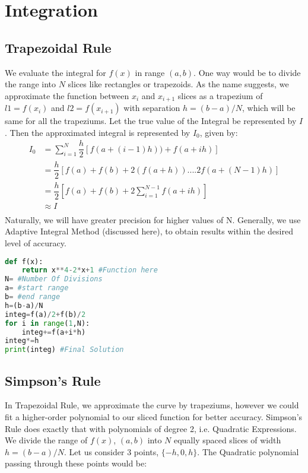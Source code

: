 \section{Integration}
\label{sec:Int}
\subsection{Trapezoidal Rule}
We evaluate the integral for $f(x)$ in range $(a,b)$. One way would be to divide the range into $N$ slices like rectangles or trapezoids. As the name suggests, we approximate the function between $x_{i}$ and $x_{i+1}$ slices as a trapezium of $l1=f(x_{i})$ and $l2=f(x_{i+1})$ with separation  $h=(b-a)/N$, which will be same for all the trapeziums. Let the true value of the Integral be represented by $I$. Then the approximated integral is represented by $I_{0}$, given by:
\[\begin{split}
I_{0}&=\sum_{i=1}^{N}\dfrac{h}{2}[f(a+(i-1)h))+f(a+ih)] \\
&=\dfrac{h}{2}[f(a)+f(b)+2(f(a+h))....2f(a+(N-1)h)]\\
&= \dfrac{h}{2}[f(a)+f(b)+2\sum_{i=1}^{N-1}f(a+ih)]\\
&\approx I\\
\end{split}
\]
Naturally, we will have greater precision for higher values of N. Generally, we use Adaptive Integral Method (discussed here), to obtain results within the desired level of accuracy.
\begin{lstlisting}[language=Python, caption=Trapezoidal Rule, frame=single, label={lst:L3} ]
def f(x):
	return x**4-2*x+1 #Function here
N= #Number Of Divisions
a= #start range
b= #end range
h=(b-a)/N
integ=f(a)/2+f(b)/2
for i in range(1,N):
	integ+=f(a+i*h)
integ*=h
print(integ) #Final Solution
\end{lstlisting}
\subsection{Simpson's Rule}
In Trapezoidal Rule, we approximate the curve by trapeziums, however we could fit a higher-order polynomial to our sliced function for better accuracy. Simpson's Rule does exactly that with polynomials of degree 2, i.e. Quadratic Expressions. We divide the range of $f(x)$, $(a,b)$ into $N$ equally spaced slices of width $h=(b-a)/N$. Let us consider 3 points, $\{-h,0,h\}$. The Quadratic polynomial passing through these points would be:
 
